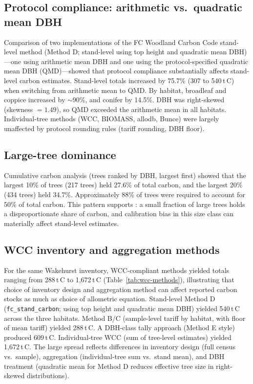 \documentclass[12pt,a4paper]{article}
\begin{document}
\subsection{Protocol compliance: arithmetic vs.\ quadratic mean DBH}

Comparison of two implementations of the FC Woodland Carbon Code stand-level method (Method D; stand-level using top height and quadratic mean DBH)---one using arithmetic mean DBH and one using the protocol-specified quadratic mean DBH (QMD)---showed that protocol compliance substantially affects stand-level carbon estimates. Stand-level totals increased by 75.7\% (307 to 540\,t\,C) when switching from arithmetic mean to QMD. By habitat, broadleaf and coppice increased by $\sim$90\%, and conifer by 14.5\%. DBH was right-skewed (skewness $= 1.49$), so QMD exceeded the arithmetic mean in all habitats. Individual-tree methods (WCC, BIOMASS, allodb, Bunce) were largely unaffected by protocol rounding rules (tariff rounding, DBH floor).

\subsection{Large-tree dominance}

Cumulative carbon analysis (trees ranked by DBH, largest first) showed that the largest 10\% of trees (217 trees) held 27.6\% of total carbon, and the largest 20\% (434 trees) held 34.7\%. Approximately 88\% of trees were required to account for 50\% of total carbon. This pattern supports \citet{Calders2022}: a small fraction of large trees holds a disproportionate share of carbon, and calibration bias in this size class can materially affect stand-level estimates.

\subsection{WCC inventory and aggregation methods}

For the same Wakehurst inventory, WCC-compliant methods yielded totals ranging from 288\,t\,C to 1,672\,t\,C (Table~\ref{tab:wcc-methods}), illustrating that choice of inventory design and aggregation method can affect reported carbon stocks as much as choice of allometric equation. Stand-level Method D (\texttt{fc\_stand\_carbon}; using top height and quadratic mean DBH) yielded 540\,t\,C across the three habitats. Method B/C (sample-level tariff by habitat, with floor of mean tariff) yielded 288\,t\,C. A DBH-class tally approach (Method E style) produced 609\,t\,C. Individual-tree WCC (sum of tree-level estimates) yielded 1,672\,t\,C. The large spread reflects differences in inventory design (full census vs.\ sample), aggregation (individual-tree sum vs.\ stand mean), and DBH treatment (quadratic mean for Method D reduces effective tree size in right-skewed distributions).
\end{document}
